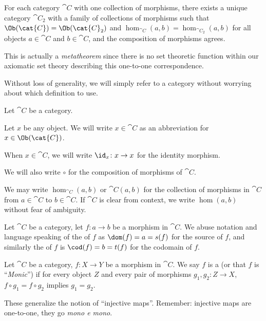 \begin{theorem}
For each category $\cat{C}$ with one collection of morphisms, there
exists a unique category $\cat{C}_{2}$ with a family of collections of
morphisms such that $\Ob(\cat{C})=\Ob(\cat{C}_{2})$ and
$\hom_{\cat{C}}(a,b)=\hom_{\cat{C}_{2}}(a,b)$ for all objects
$a\in\cat{C}$ and $b\in\cat{C}$,  and the composition of morphisms agrees.
\end{theorem}

This is actually a \emph{metatheorem} since there is no set theoretic
function within our axiomatic set theory describing this one-to-one
correspondence.

\begin{remark}
Without loss of generality, we will simply refer to a category without
worrying about which definition to use.
\end{remark}

\begin{definition}
Let $\cat{C}$ be a category.

Let $x$ be any object.
We will write $x\in\cat{C}$ as an abbreviation for $x\in\Ob(\cat{C})$.

When $x\in\cat{C}$, we will write $\id_{x}\colon x\to x$ for the
identity morphism.

We will also write $\circ$ for the composition of morphisms of $\cat{C}$.

We may write $\hom_{\cat{C}}(a,b)$ or $\cat{C}(a,b)$ for the
collection of morphisms in $\cat{C}$ from $a\in\cat{C}$ to $b\in\cat{C}$.
If $\cat{C}$ is clear from context, we write $\hom(a,b)$ without fear
of ambiguity.
\end{definition}

\begin{definition}\label{defn:cat:domain-and-codomain}
Let $\cat{C}$ be a category, let $f\colon a\to b$ be a morphism in
$\cat{C}$. We abuse notation and language speaking of the
 of $f$ as $\dom(f)=a=s(f)$ for the source of
$f$, and similarly the  of $f$ is $\cod(f)=b=t(f)$ for the codomain of $f$.
\end{definition}

\begin{definition}[Monomorphisms]
Let $\cat{C}$ be a category, $f\colon X\to Y$ be a morphism in $\cat{C}$.
We say $f$ is a  (or that $f$ is ``\emph{Monic}'') if
for every object $Z$ and every pair of morphisms $g_{1},g_{2}\colon Z\to X$,
$f\circ g_{1}=f\circ g_{2}$ implies $g_{1}=g_{2}$.

These generalize the notion of ``injective maps''. Remember: injective
maps are one-to-one, they go \emph{mono e mono}.
\end{definition}

